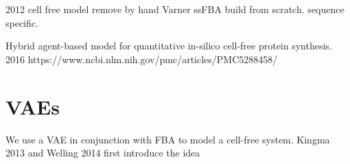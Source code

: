 2012 cell free model remove by hand \cite{bujara2012silico}
Varner ssFBA build from scratch. sequence specific. \cite{vilkhovoy2017sequence}

Hybrid agent-based model for quantitative in-silico cell-free protein synthesis. 2016
https://www.ncbi.nlm.nih.gov/pmc/articles/PMC5288458/

\section{VAEs}
We use a VAE in conjunction with FBA to model a cell-free system.
Kingma 2013 and Welling 2014 first introduce the idea